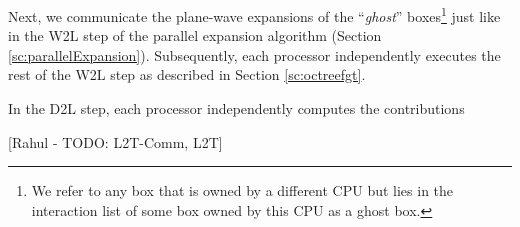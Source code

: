 
 Next, we communicate the plane-wave expansions of the ``{\em ghost}'' boxes\footnote{We refer to any box that
 is owned by a different CPU but lies in the interaction list of some box owned by this CPU as a ghost box.} just
 like in the W2L step of the parallel expansion algorithm (Section \ref{sc:parallelExpansion}). Subsequently, each processor 
 independently executes the rest of the W2L step as described in Section \ref{sc:octreefgt}.

In the D2L step, each processor independently computes the contributions

[Rahul - TODO: L2T-Comm, L2T]

%
%


